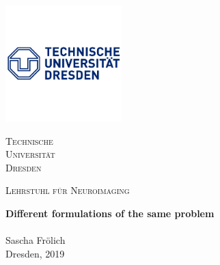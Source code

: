\begin{titlepage}
	\vspace*{0.5cm}
	\begin{center}
		\begin{minipage}{5.5cm} %
			\centering
			\includegraphics[width=4.5cm]{images/logos/TUD} %
		\end{minipage}
	\end{center}
	\vspace*{0cm}
	\begin{center}
		\begin{minipage}{5.5cm}
			\centering
			\textsc{Technische \\ Universit\"{a}t \\ Dresden}
		\end{minipage}
		\hfill
		\begin{minipage}{3.5cm}
			\centering
			\textsc{}
		\end{minipage}
		\hfill
		\begin{minipage}{5cm}
			\centering
			\textsc{Lehrstuhl f\"{u}r Neuroimaging}
		\end{minipage}
	\end{center}
	\vspace*{1cm}
	\begin{center}
		\Huge \textbf{Different formulations of the same problem}\\[1.5cm]
		\large \textbf{}\\[2.25cm]
		\large Sascha Fr\"{o}lich\\[0.25cm]
		\large Dresden, 2019 \\[0.5cm]
	\end{center}
\end{titlepage}
